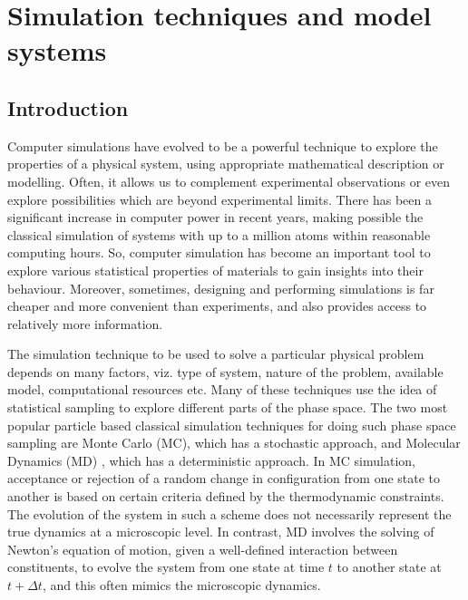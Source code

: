 \pagestyle{fancy}
\fancyhf{}
\renewcommand{\headrulewidth}{0pt}
\fancyfoot[C]{\leftmark}
\fancyhead[R]{\thepage}
\doublespacing
\chapter{Simulation techniques and model systems}\label{chap2}

\section{Introduction}
Computer simulations have evolved to be a powerful technique to explore the properties of a physical system, using appropriate mathematical description or modelling. Often, it allows us to complement experimental observations or even explore possibilities which are beyond experimental limits. There has been a significant increase in computer power in recent years, making possible the classical simulation of systems with up to a million atoms within reasonable computing hours. So, computer simulation has become an important tool to explore various statistical properties of materials to gain insights into their behaviour. Moreover, sometimes, designing and performing simulations is far cheaper and more convenient than experiments, and also provides access to relatively more information. 
    
The simulation technique to be used to solve a particular physical problem depends on many factors, viz. type of system, nature of the problem, available model, computational resources etc. Many of these techniques use the idea of statistical sampling to explore different parts of the phase space. The two most popular particle based classical simulation techniques for doing such phase space sampling are Monte Carlo (MC)\cite{binder2011glassy,metropolis1949monte,allen2017,frenkel2001understanding}, which has a stochastic approach, and Molecular Dynamics (MD) \cite{alder1957phase,alder1959studies,rahman1964correlations,binder2011glassy,allen2017,frenkel2001understanding}, which has a deterministic approach. In MC simulation, acceptance or rejection of a random change in configuration from one state to another is based on certain criteria defined by the thermodynamic constraints. The evolution of the system in such a scheme does not necessarily represent the true dynamics at a microscopic level. In contrast, MD involves the solving of Newton's equation of motion, given a well-defined interaction between constituents, to evolve the system from one state at time $t$ to another state at $t + \Delta t$, and this often mimics the microscopic dynamics.
    
